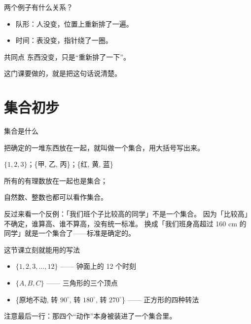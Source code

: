 \documentclass[10pt]{beamer}
\begin{document}
\begin{frame}{两个例子有什么关系？}
  \begin{itemize}
    \item 队形：人没变，位置上重新排了一遍。
    \item 时间：表没变，指针绕了一圈。
  \end{itemize}

  \begin{block}{共同点}
    东西没变，只是“重新排了一下”。
  \end{block}
    这门课要做的，就是把这句话说清楚。
\end{frame}

\section{集合初步}

\begin{frame}{集合是什么}
  \begin{definition}[集合]
    把确定的一堆东西放在一起，就叫做一个集合，用大括号写出来。
  \end{definition}

  \begin{example}
    \(\{1, 2, 3\}\)；\quad \{甲, 乙, 丙\}；\quad \{红, 黄, 蓝\}

    所有的有理数放在一起也是集合；

    自然数、整数也都可以看作集合。
  \end{example}

  \begin{att}
    反过来看一个反例：「我们班个子比较高的同学」不是一个集合。
    因为「比较高」不确定，谁算高、谁不算高，没有统一标准。
    换成「我们班身高超过 160 cm 的同学」就是一个集合了——标准是确定的。
  \end{att}

\end{frame}

\begin{frame}{这节课立刻就能用的写法}
  \begin{itemize}
    \item \(\{1, 2, 3, \dots, 12\}\) —— 钟面上的 12 个时刻
    \item \(\{A, B, C\}\) —— 三角形的三个顶点
    \item \{原地不动, 转 \(90^\circ\), 转 \(180^\circ\), 转 \(270^\circ\)\} —— 正方形的四种转法
  \end{itemize}

  \begin{att}
    注意最后一行：那四个“动作”本身被装进了一个集合里。
  \end{att}
\end{frame}
\end{document}
